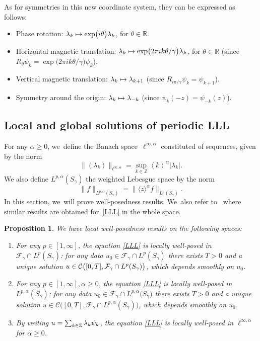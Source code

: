 \documentclass[10pt]{amsart}
\newcommand\mto{\mathchoice{\longmapsto}{\mapsto}{\mapsto}{\mapsto}}
\newtheorem{prop}[theorem]{Proposition}
\theoremstyle{definition}
\let\EE\exp
\let\dis\relax
\let\<\langle
\let\>\rangle
\newcommand\Z{\mathbb Z}
\newcommand{\bra}[1]{\left\langle #1 \right\rangle}
\begin{document}
As for symmetries in this new coordinate system, they can be expressed as follows:
\begin{itemize}
\item Phase rotation: $\lambda_k \mto \EE\bigl({i\theta}\bigr) \lambda_k$, for $\theta\in \mathbb{R}$.
\item Horizontal magnetic translation: $\dis \lambda_k \mto \EE\bigl({2\pi i k \theta}/{\gamma}\bigr) \lambda_k$, for $\theta \in \mathbb{R}$ (since $R_\theta \psi_k = \EE\bigl({2\pi i k \theta/ \gamma}\bigr) \psi_k$).
\item Vertical magnetic translation: $\lambda_k \mto \lambda_{k+1}$ (since $R_{{i\pi}/{\gamma}} \psi_k = \psi_{k+1}$).
\item Symmetry around the origin: $\lambda_k \mto \lambda_{-k}$ (since $\psi_k(-z) = \psi_{-k}(z)$).
\end{itemize}

\subsection{Local and global solutions of periodic LLL}

For any $\alpha \geq 0$, we~define the Banach space~$\ell^{\infty,\alpha}$ constituted of sequences, given by the norm
\[
\|(\lambda_k)\|_{\ell^{\infty,\alpha}} = \sup_{k\in\mathbb{Z}} \bra{k}^\alpha |\lambda_k|.
\]
We also define $L^{p, \alpha}(S_\gamma)$ the weighted Lebesgue space by the norm
\[
\|f\|_{L^{p,\alpha}(S_\gamma)} = \|\< z\>^\alpha f\|_{L^p(S_\gamma)}.
\]
In this section, we~will prove well-posedness results. We~also refer to~\cite[\S 3]{GGT} where similar results are obtained for~\eqref{LLL} in the whole space.

\begin{prop}\label{LWP}
We have local well-posedness results on the following spaces:
\begin{enumerate}
\item\label{LWPi} For any $p \in [1,\infty]$, the equation \eqref{LLL} is locally well-posed in $\mathcal{F}_{\gamma} \cap L^p(S_{\gamma})$: for any data $u_0 \in \mathcal{F}_{\gamma} \cap L^p(S_{\gamma})$ there exists $T > 0$ and a unique solution $u \in \mathcal{C}\bigl([0, T], \mathcal{F}_{\gamma} \cap\nobreak L^p(S_{\gamma})\bigr)$, which depends smoothly on $u_0$.
\item\label{LWPii} For any $p \in [1,\infty], \alpha \geq 0$, the equation \eqref{LLL} is locally well-posed in $L^{p,\alpha}(S_{\gamma})$: for any data $u_0 \in \mathcal{F}_{\gamma} \cap L^{p,\alpha}\bigl(S_{\gamma}\bigr)$ there exists $T > 0$ and a unique solution $u \in \mathcal{C}\bigl([0, T], \mathcal{F}_{\gamma} \cap L^{p,\alpha}(S_\gamma)\bigr)$, which depends smoothly on $u_0$.
\item\label{LWPiii} By writing $\dis u= \sum_{k\in\Z} \lambda_k\psi_k$, the equation \eqref{LLL} is locally well-posed in $\ell^{\infty,\alpha}$ for $\alpha \geq 0$.
\end{enumerate}
\end{prop}
\end{document}
